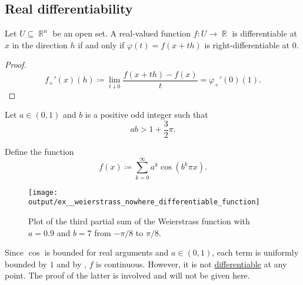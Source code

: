 \subsection{Real differentiability}\label{subsec:real_differentiability}

\begin{proposition}\label{thm:real_valued_differentiability}
  Let \( U \subseteq \BbbR^n \) be an open set. A real-valued function \( f: U \to \BbbR \) is differentiable at \( x \) in the direction \( h \) if and only if \( \varphi(t) = f(x + th) \) is right-differentiable at \( 0 \).
\end{proposition}
\begin{proof}
  \begin{equation*}
    f_+'(x)(h) \coloneqq \lim_{t \downarrow 0} \frac {f(x + th) - f(x)} t = \varphi_+'(0)(1).
  \end{equation*}
\end{proof}

\begin{example}\label{ex:weierstrass_nowhere_differentiable_function}
  Let \( a \in (0, 1) \) and \( b \) is a positive odd integer such that
  \begin{equation*}
    ab > 1 + \frac 3 2 \pi.
  \end{equation*}

  Define the function
  \begin{equation*}
    f(x) \coloneqq \sum_{k=0}^\infty a^k \cos(b^k \pi x).
  \end{equation*}

  \begin{figure}[!ht]
    \centering
    \texttt{[image: output/ex\_\_weierstrass\_nowhere\_differentiable\_function]}
    \caption
    {
      Plot of the third partial sum of the Weierstrass function with \( a = 0.9 \) and \( b = 7 \) from \( -\pi / 8 \) to \( \pi / 8 \).
    }
    \label{fig:ex:weierstrass_nowhere_differentiable_function/plot}
  \end{figure}

  Since \( \cos \) is bounded for real arguments and \( a \in (0, 1) \), each term is uniformly bounded by \( 1 \) and by , \( f \) is continuous. However, it is not \hyperref[def:differentiability]{differentiable} at any point. The proof of the latter is involved and will not be given here.
\end{example}

